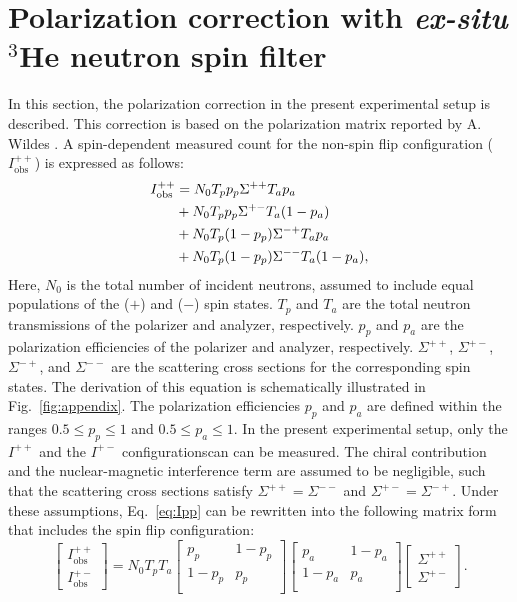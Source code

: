 \documentclass[%
 reprint,
superscriptaddress,
 amsmath,amssymb,
 aps,
floatfix,
]{revtex4-2}
\newcommand{\He}{$^3$He }
\begin{document}
\appendix
\section{Polarization correction with \textit{ex-situ} \He neutron spin filter}
\label{appendix}
In this section, the polarization correction in the present experimental setup is described.
This correction is based on the polarization matrix reported by A. Wildes \cite{wildes_polarizer-analyzer_1999,wildes_scientific_2006}.
A spin-dependent measured count for the non-spin flip configuration ($I^{++}_\mathrm{obs}$) is expressed as follows:
\begin{align}
    I^{++}_\mathrm{obs} &= N_0 T_p p_p \Sigma^{++} T_a p_a \notag \\
    &+ N_0 T_p p_p \Sigma^{+-} T_a (1-p_a) \notag\\
    &+N_0 T_p (1-p_p) \Sigma^{-+} T_a p_a \notag \\
    &+ N_0 T_p (1-p_p) \Sigma^{--} T_a (1-p_a),
    \label{eq:Ipp}
\end{align}
Here, $N_0$ is the total number of incident neutrons, assumed to include equal populations of the ($+$) and ($-$) spin states.
$T_p$ and $T_a$ are the total neutron transmissions of the polarizer and analyzer, respectively.
$p_p$ and $p_a$ are the polarization efficiencies of the polarizer and analyzer, respectively.
$\Sigma^{++}$, $\Sigma^{+-}$, $\Sigma^{-+}$, and $\Sigma^{--}$ are the scattering cross sections for the corresponding spin states.
The derivation of this equation is schematically illustrated in Fig.~\ref{fig:appendix}.
The polarization efficiencies $p_p$ and $p_a$ are defined within the ranges $0.5 \leq p_p \leq 1$ and $0.5 \leq p_a \leq 1$.
In the present experimental setup, only the $I^{++}$ and the $I^{+-}$ configurationscan can be measured.
The chiral contribution and the nuclear-magnetic interference term are assumed to be negligible, such that the scattering cross sections satisfy $\Sigma^{++} = \Sigma^{--}$ and $\Sigma^{+-} = \Sigma^{-+}$.
Under these assumptions, Eq.~\ref{eq:Ipp} can be rewritten into the following matrix form that includes the spin flip configuration:
\begin{equation}
    \begin{bmatrix}
        I^{++}_\mathrm{obs} \\
        I^{+-}_\mathrm{obs}
    \end{bmatrix}
    =
    N_0T_pT_a
    \begin{bmatrix}
        p_p & 1-p_p \\
        1-p_p & p_p \\
    \end{bmatrix}
    \begin{bmatrix}
        p_a&1-p_a \\
        1-p_a&p_a \\
    \end{bmatrix}
    \begin{bmatrix}
        \Sigma^{++} \\
        \Sigma^{+-}
    \end{bmatrix}.
    \label{eq:Ipp_Ipm}
\end{equation}
\end{document}

